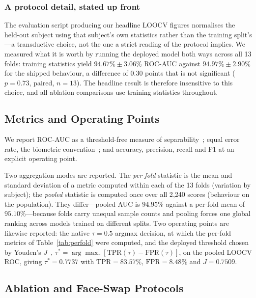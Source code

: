 \documentclass[conference]{IEEEtran}
\begin{document}
\subsubsection{A protocol detail, stated up front}
\label{sec:transductive}
The evaluation script producing our headline LOOCV figures normalises the
held-out subject using that subject's own statistics rather than the training
split's---a transductive choice, not the one a strict reading of the protocol
implies. We measured what it is worth by running the deployed model both ways
across all 13 folds: training statistics yield $94.67\% \pm 3.06\%$ ROC-AUC
against $94.97\% \pm 2.90\%$ for the shipped behaviour, a difference of $0.30$
points that is not significant ($p = 0.73$, paired, $n = 13$). The headline
result is therefore insensitive to this choice, and all ablation comparisons
use training statistics throughout.

\subsection{Metrics and Operating Points}

We report ROC-AUC as a threshold-free measure of separability~\cite{fawcett_roc};
equal error rate, the biometric convention~\cite{iso19795}; and accuracy,
precision, recall and F1 at an explicit operating point.

Two aggregation modes are reported. The \emph{per-fold} statistic is the mean
and standard deviation of a metric computed within each of the 13 folds
(variation by subject); the \emph{pooled} statistic is computed once over all
2{,}240 scores (behaviour on the population). They differ---pooled AUC is
$94.95\%$ against a per-fold mean of $95.10\%$---because folds carry unequal
sample counts and pooling forces one global ranking across models trained on
different splits. Two operating points are likewise reported: the native
$\tau = 0.5$ argmax decision, at which the per-fold metrics of
Table~\ref{tab:perfold} were computed, and the deployed threshold chosen by
Youden's $J$~\cite{youden},
$\tau^* = \arg\max_\tau [\mathrm{TPR}(\tau) - \mathrm{FPR}(\tau)]$, on the
pooled LOOCV ROC, giving $\tau^* = 0.7737$ with $\mathrm{TPR} = 83.57\%$,
$\mathrm{FPR} = 8.48\%$ and $J = 0.7509$.

\subsection{Ablation and Face-Swap Protocols}
\end{document}
